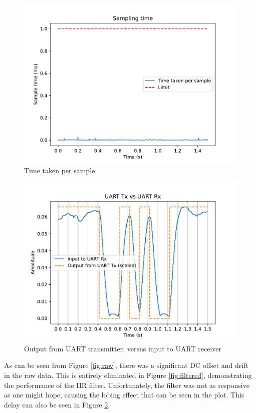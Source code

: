 \documentclass{article}
\begin{document}
\begin{multicols}{2}
\begin{figure}[H]
    \includegraphics[width=\linewidth]{figures/sampling.pdf}
    \caption{Time taken per sample}
    \label{fig:sampling}
\end{figure}

\begin{figure}[H]
    \includegraphics[width=\linewidth]{figures/uart.pdf}
    \caption{Output from UART transmitter, versus input to UART receiver}
    \label{fig:uart}
\end{figure}

As can be seen from Figure \ref{fig:raw}, there was a significant DC offset and drift in the raw data. This is entirely eliminated in Figure \ref{fig:filtered}, demonstrating the performance of the IIR filter. Unfortunately, the filter was not as responsive as one might hope, causing the lobing effect that can be seen in the plot. This delay can also be seen in Figure \ref{fig:uart}. 


\end{multicols}
\end{document}

